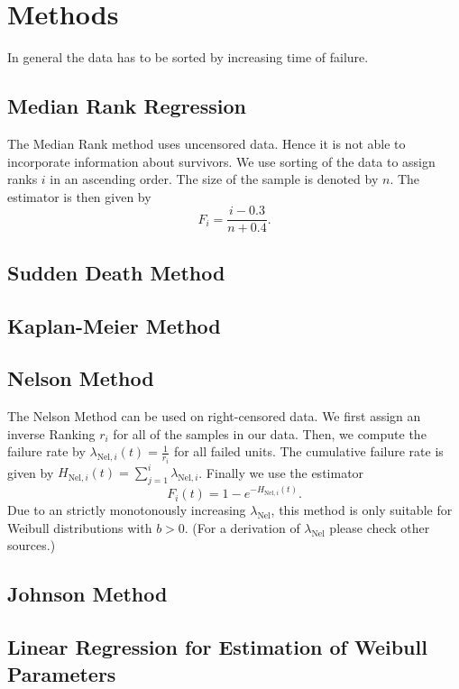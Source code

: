 \section{Methods}
In general the data has to be sorted by increasing time of failure.

\subsection{Median Rank Regression}
The Median Rank method uses uncensored data. Hence it is not able to incorporate information about survivors. 
We use sorting of the data to assign ranks $i$ in an ascending order. The size of the sample is denoted by $n$. The estimator is then given by
$$ F_i = \frac{i - 0.3}{n + 0.4}.$$

\subsection{Sudden Death Method}

\subsection{Kaplan-Meier Method}

\subsection{Nelson Method}
The Nelson Method can be used on right-censored data. We first assign an inverse Ranking $r_i$ for all of the samples in our data. Then, we compute the failure rate by $\lambda_{\text{Nel}, i}(t) = \frac{1}{r_i}$ for all failed units. The cumulative failure rate is given by $H_{\text{Nel}, i}(t) = \sum_{j=1}^{i} \lambda_{\text{Nel}, i}$. Finally we use the estimator
$$ F_i(t) = 1 - e^{-H_{\text{Nel}, i}(t)}. $$
Due to an strictly monotonously increasing $\lambda_{\text{Nel}}$, this method is only suitable for Weibull distributions with $b>0$. (For a derivation of $\lambda_{\text{Nel}}$ please check other sources.)

\subsection{Johnson Method}

\subsection{Linear Regression for Estimation of Weibull Parameters}